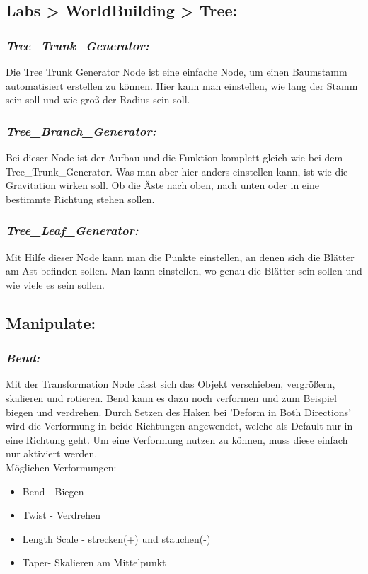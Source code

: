 \documentclass[paper=a4,fontsize=12pt,ngerman]{scrartcl}
\begin{document}
	\subsection*{Labs > WorldBuilding > Tree:}
	\subsubsection*{\textit{Tree\_Trunk\_Generator:}}
	Die Tree Trunk Generator Node ist eine einfache Node, um einen Baumstamm automatisiert erstellen zu können. Hier kann man einstellen, wie lang der Stamm sein soll und wie groß der Radius sein soll.
	\subsubsection*{\textit{Tree\_Branch\_Generator:}}
	Bei dieser Node ist der Aufbau und die Funktion komplett gleich wie bei dem Tree\_Trunk\_Generator. Was man aber hier anders einstellen kann, ist wie die Gravitation wirken soll. Ob die Äste nach oben, nach unten oder in eine bestimmte Richtung stehen sollen.
	\subsubsection*{\textit{Tree\_Leaf\_Generator:}}
	Mit Hilfe dieser Node kann man die Punkte einstellen, an denen sich die Blätter am Ast befinden sollen. Man kann einstellen, wo genau die Blätter sein sollen und wie viele es sein sollen. 
	
	\subsection*{Manipulate:}
	\subsubsection*{\textit{Bend:}}
	Mit der Transformation Node lässt sich das Objekt verschieben, vergrößern, skalieren und rotieren. Bend kann es dazu noch verformen und zum Beispiel biegen und verdrehen. Durch Setzen des Haken bei 'Deform in Both Directions' wird die Verformung in beide Richtungen angewendet, welche als Default nur in eine Richtung geht. Um eine Verformung nutzen zu können, muss diese einfach nur aktiviert werden.\\
	Möglichen Verformungen:
	\begin{itemize}
		\item Bend - Biegen
		\item Twist - Verdrehen
		\item Length Scale - strecken(+) und stauchen(-)
		\item Taper- Skalieren am Mittelpunkt
	\end{itemize}
\end{document}
